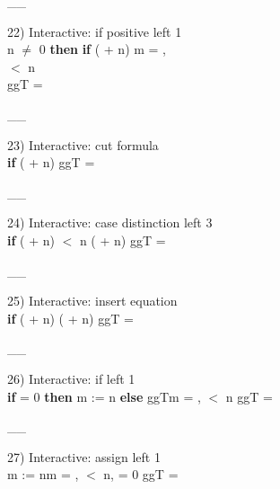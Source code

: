 \documentclass[a4paper]{article}
\begin{document}
\vspace{-1.5ex}\_\hrulefill \_

22) Interactive: if positive left  1\\
\tabf {} n $\neq$ 0 {\bf then} {\bf if} ( + n) %
m = , \\
 \tabf {} $<$ n \\
\Fol \Do ggT\Dc {} = 

\vspace{-1.5ex}\_\hrulefill \_

23) Interactive: cut formula \\
\tabf \Do 
{\bf if} ( + n) %
\Fol \Do ggT\Dc {} = 

\vspace{-1.5ex}\_\hrulefill \_

24) Interactive: case distinction  left 3\\
\tabf \Do 
{\bf if} ( + n) %
 \tabf {} $<$ n \Imp ( + n) %
\Fol \Do ggT\Dc {} = 

\vspace{-1.5ex}\_\hrulefill \_

25) Interactive: insert equation \\
\tabf \Do 
{\bf if} ( + n) %
 \tabf ( + n) %
\Fol \Do ggT\Dc {} = 

\vspace{-1.5ex}\_\hrulefill \_

26) Interactive: if left  1\\
\Do 
{\bf if}  = 0 {\bf then} m := n {\bf else} ggT\Dc m = ,  $<$ n \Fol \Do ggT\Dc {} = 

\vspace{-1.5ex}\_\hrulefill \_

27) Interactive: assign left  1\\
\Do m := n\Dc m = ,  $<$ n,  = 0 \Fol \Do ggT\Dc {} = 
\end{document}
